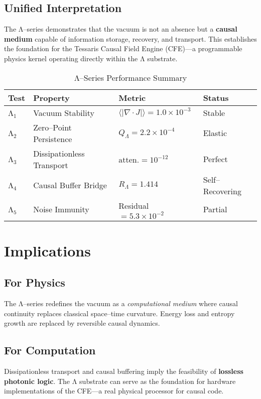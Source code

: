 \documentclass[12pt]{article}
\begin{document}
\subsection{Unified Interpretation}
The Λ--series demonstrates that the vacuum is not an absence but a \textbf{causal medium} capable of information storage, recovery, and transport.
This establishes the foundation for the Tessaris Causal Field Engine (CFE)---a programmable physics kernel operating directly within the Λ substrate.

\begin{table}[H]
\centering
\caption{Λ--Series Performance Summary}
\begin{tabular}{@{}llll@{}}
\toprule
Test & Property & Metric & Status \\
\midrule
Λ$_1$ & Vacuum Stability & $\langle |\nabla\!\cdot\!J| \rangle = 1.0\times10^{-3}$ & Stable \\
Λ$_2$ & Zero--Point Persistence & $Q_\Lambda = 2.2\times10^{-4}$ & Elastic \\
Λ$_3$ & Dissipationless Transport & $\text{atten.} = 10^{-12}$ & Perfect \\
Λ$_4$ & Causal Buffer Bridge & $R_\Lambda = 1.414$ & Self--Recovering \\
Λ$_5$ & Noise Immunity & Residual $= 5.3\times10^{-2}$ & Partial \\
\bottomrule
\end{tabular}
\end{table}

\section{Implications}

\subsection{For Physics}
The Λ--series redefines the vacuum as a \textit{computational medium} where causal continuity replaces classical space--time curvature.
Energy loss and entropy growth are replaced by reversible causal dynamics.

\subsection{For Computation}
Dissipationless transport and causal buffering imply the feasibility of \textbf{lossless photonic logic}.
The Λ substrate can serve as the foundation for hardware implementations of the CFE---a real physical processor for causal code.
\end{document}
